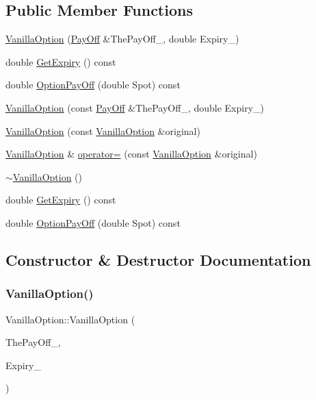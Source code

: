 \subsection*{Public Member Functions}
\begin{DoxyCompactItemize}
\item 
\hyperlink{classVanillaOption_ae1f74c7c0c5a6b5b9d134b2f0709ed68}{Vanilla\+Option} (\hyperlink{classPayOff}{Pay\+Off} \&The\+Pay\+Off\+\_\+, double Expiry\+\_\+)
\item 
double \hyperlink{classVanillaOption_a7118ee621b3a833a369546e249ef6778}{Get\+Expiry} () const
\item 
double \hyperlink{classVanillaOption_af7f88627dec1267761a02bab1fc1c535}{Option\+Pay\+Off} (double Spot) const
\item 
\hyperlink{classVanillaOption_a6da83c3102ce2a55440108768b0138c7}{Vanilla\+Option} (const \hyperlink{classPayOff}{Pay\+Off} \&The\+Pay\+Off\+\_\+, double Expiry\+\_\+)
\item 
\hyperlink{classVanillaOption_a2eea352d4a1afbff2807f248dd1fb109}{Vanilla\+Option} (const \hyperlink{classVanillaOption}{Vanilla\+Option} \&original)
\item 
\hyperlink{classVanillaOption}{Vanilla\+Option} \& \hyperlink{classVanillaOption_a7b831ab1cf0ee2a0d75e3a91eee193b8}{operator=} (const \hyperlink{classVanillaOption}{Vanilla\+Option} \&original)
\item 
\hyperlink{classVanillaOption_a77f6412e2aef7b4fbc7203fdb59f270d}{$\sim$\+Vanilla\+Option} ()
\item 
double \hyperlink{classVanillaOption_a7118ee621b3a833a369546e249ef6778}{Get\+Expiry} () const
\item 
double \hyperlink{classVanillaOption_af7f88627dec1267761a02bab1fc1c535}{Option\+Pay\+Off} (double Spot) const
\end{DoxyCompactItemize}


\subsection{Constructor \& Destructor Documentation}
\hypertarget{classVanillaOption_ae1f74c7c0c5a6b5b9d134b2f0709ed68}{}\label{classVanillaOption_ae1f74c7c0c5a6b5b9d134b2f0709ed68} 
\subsubsection{\texorpdfstring{Vanilla\+Option()}{VanillaOption()}\hspace{0.1cm}{\footnotesize\ttfamily [1/3]}}
{\footnotesize\ttfamily Vanilla\+Option\+::\+Vanilla\+Option (\begin{DoxyParamCaption}\item[{\hyperlink{classPayOff}{Pay\+Off} \&}]{The\+Pay\+Off\+\_\+,  }\item[{double}]{Expiry\+\_\+ }\end{DoxyParamCaption})}


